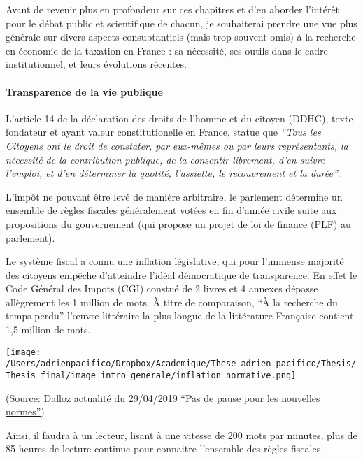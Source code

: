Avant de revenir plus en profondeur sur ces chapitres et d'en aborder
l'intérêt pour le débat public et scientifique de chacun, je souhaiterai
prendre une vue plus générale sur divers aspects consubtantiels (mais
trop souvent omis) à la recherche en économie de la taxation en France :
sa nécessité, ses outils dans le cadre institutionnel, et leurs
évolutions récentes.


\paragraph{Transparence de la vie
publique}

L'article 14 de la déclaration des droits de l'homme et du citoyen
(DDHC), texte fondateur et ayant valeur constitutionelle en France,
statue que \emph{``Tous les Citoyens ont le droit de constater, par
eux-mêmes ou par leurs représentants, la nécessité de la contribution
publique, de la consentir librement, d'en suivre l'emploi, et d'en
déterminer la quotité, l'assiette, le recouvrement et la durée''}.

L'impôt ne pouvant être levé de manière arbitraire, le parlement
détermine un ensemble de règles fiscales généralement votées en fin
d'année civile suite aux propositions du gouvernement (qui propose un
projet de loi de finance (PLF) au parlement).

Le système fiscal a connu une inflation législative, qui pour l'immense
majorité des citoyens empêche d'atteindre l'idéal démocratique de
transparence. En effet le Code Général des Impots (CGI) constué de 2
livres et 4 annexes dépasse allègrement les 1 million de mots. À
titre de comparaison, ``À la recherche du temps perdu'' l'œuvre
littéraire la plus longue de la littérature Française contient 1,5
million de mots.

\begin{center}
\texttt{[image: /Users/adrienpacifico/Dropbox/Academique/These\_adrien\_pacifico/Thesis/Thesis\_final/image\_intro\_generale/inflation\_normative.png]}
  
\end{center}

(Source:
\href{https://www.dalloz-actualite.fr/flash/pas-de-pause-pour-nouvelles-normes\#.XMaXrqS-iEc}{Dalloz
actualité du 29/04/2019 ``Pas de pause pour les nouvelles normes''})

Ainsi, il faudra à un lecteur, lisant à une vitesse de 200 mots par
minutes, plus de 85 heures de lecture continue pour connaitre l'ensemble
des règles fiscales.


